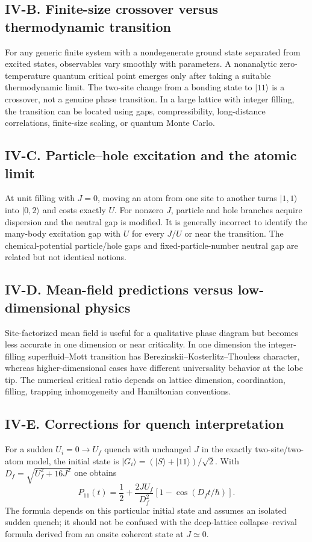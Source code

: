 \documentclass[11pt,a4paper]{article}
\begin{document}
\subsection*{IV-B. Finite-size crossover versus thermodynamic transition}
For any generic finite system with a nondegenerate ground state separated from excited states, observables vary smoothly with parameters. A nonanalytic zero-temperature quantum critical point emerges only after taking a suitable thermodynamic limit. The two-site change from a bonding state to $|11\rangle$ is a crossover, not a genuine phase transition. In a large lattice with integer filling, the transition can be located using gaps, compressibility, long-distance correlations, finite-size scaling, or quantum Monte Carlo.
\subsection*{IV-C. Particle--hole excitation and the atomic limit}
At unit filling with $J=0$, moving an atom from one site to another turns $|1,1\rangle$ into $|0,2\rangle$ and costs exactly $U$. For nonzero $J$, particle and hole branches acquire dispersion and the neutral gap is modified. It is generally incorrect to identify the many-body excitation gap with $U$ for every $J/U$ or near the transition. The chemical-potential particle/hole gaps and fixed-particle-number neutral gap are related but not identical notions.
\subsection*{IV-D. Mean-field predictions versus low-dimensional physics}
Site-factorized mean field is useful for a qualitative phase diagram but becomes less accurate in one dimension or near criticality. In one dimension the integer-filling superfluid--Mott transition has Berezinskii--Kosterlitz--Thouless character, whereas higher-dimensional cases have different universality behavior at the lobe tip. The numerical critical ratio depends on lattice dimension, coordination, filling, trapping inhomogeneity and Hamiltonian conventions.
\subsection*{IV-E. Corrections for quench interpretation}
For a sudden $U_i=0\to U_f$ quench with unchanged $J$ in the exactly two-site/two-atom model, the initial state is $|G_i\rangle=(|S\rangle+|11\rangle)/\sqrt2$. With $D_f=\sqrt{U_f^2+16J^2}$ one obtains
\begin{equation}
P_{11}(t)=\frac12+\frac{2JU_f}{D_f^2}\left[1-\cos(D_f t/\hbar)\right].
\end{equation}
The formula depends on this particular initial state and assumes an isolated sudden quench; it should not be confused with the deep-lattice collapse--revival formula derived from an onsite coherent state at $J\simeq0$.
\end{document}
